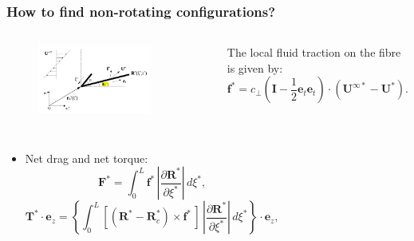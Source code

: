 \documentclass{beamer}
\newcommand{\bi}{\begin{itemize}}
\newcommand{\ei}{\end{itemize}}
\begin{document}
\begin{frame}
	\frametitle{How to find non-rotating configurations?}
	\begin{overlayarea}{\textwidth}{\textheight}
		\vspace{-0.6cm}
		\begin{columns}
			\begin{figure}[htb]
				\begin{center}
					\includegraphics[width=0.8\textwidth]{plots/schematic/schematic_rigid_configuration_color2.png}
				\end{center}
			\end{figure}\vspace{0.3cm}
			\small The local fluid traction on the fibre is given by: 
			\begin{equation*}
				\mathbf{f}^*=c_\perp\left(\mathbf{I}-\frac{1}{2}\mathbf{e}_t\mathbf{e}_t\right)\cdot(\mathbf{U}^{\infty*}-\mathbf{U}^*).
			\end{equation*}
		\end{columns}\vspace{-0.5cm}
		\begin{columns}
			\bi \small
			\item Net drag and net torque: 	\scriptsize
			\begin{equation*}
				\label{eqn:52}
				\textbf{F}^*=\int^L_0 \textbf{f}^*\, \left|\frac{\partial\textbf{R}^*}{\partial\xi^*}\right|\,d\xi^*, 
			\end{equation*}
			\begin{equation*}
				\label{eqn:53}
				\mathbf{T}^*\cdot\textbf{e}_z=\left\{\int^L_0 \left[(\textbf{R}^*-\textbf{R}_c^*)\times \textbf{f}^*\,\right]\,\left|\frac{\partial\textbf{R}^*}{\partial\xi^*}\right|\,d\xi^*\right\}\cdot\textbf{e}_z,
			\end{equation*}\vspace{-0.3cm}
			\ei
			 \vspace{-0.1cm}
		\end{columns}
		\vspace{0.5cm}
	\end{overlayarea}
\end{frame}
\end{document}
